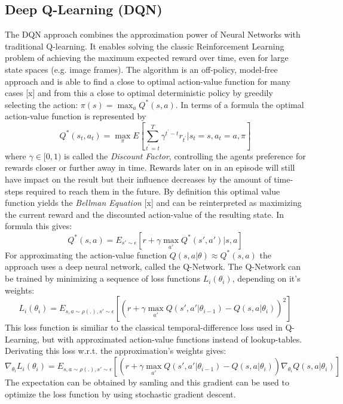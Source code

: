 \subsection{Deep Q-Learning (DQN) }
\nocite{mnih2015human}
\nocite{mnih2013playing}
\label{sec:DQN}
The DQN approach combines the approximation power of Neural Networks with traditional Q-learning.
It enables solving the classic Reinforcement Learning problem of achieving the maximum expected reward over time, even for large state spaces (e.g. image frames). The algorithm is an off-policy, model-free approach and is able to find a close to optimal action-value function for many cases [x] and from this a close to optimal deterministic policy by greedily selecting the action: $\pi(s)=\max_{a}Q^*(s,a)$. In terms of a formula the optimal action-value function is represented by
\[ 
Q^*(s_t,a_t)=\max_\pi E \left[
\sum_{t^{'}=t}^{T}\gamma^{t^{'}-t}r_{t^{'}}|s_t=s,
a_t=a, \pi \right] 
\]
 where $\gamma\in[0,1)$ is called the \textit{Discount Factor}, controlling the agents preference for rewards closer or further away in time. Rewards later on in an episode will still have impact on the result but their influence decreases by the amount of time-steps required to reach them in the future.
By definition this optimal value function yields the \textit{Bellman Equation} [x] and can be reinterpreted as maximizing the current reward and the discounted action-value of the resulting state. In formula this gives:
\[
Q^*(s,a) = E_{s'\sim\epsilon}\left[
r + \gamma \max_{a'}Q^*(s',a')|s,a \right]
\]
For approximating the action-value function $Q(s,a|\theta)\approx Q^*(s,a)$ the approach uses a deep neural network, called the Q-Network.
The Q-Network can be trained by minimizing a sequence of loss functions $L_i(\theta_i)$, depending on it's weights:
\[
L_i(\theta_i)=E_{s,a\sim\rho(.),s'\sim\epsilon}
\left[\left(r+\gamma \max_{a'} Q(s', 
a'|\theta_{i-1})-Q(s,a|\theta_i)\right)^2\right] 
\]
This loss function is similiar to the classical temporal-difference loss used in Q-Learning, but with approximated action-value functions instead of lookup-tables. Derivating this loss w.r.t. the approximation's weights gives:
\[
\nabla_{\theta_i}L_i(\theta_i)=E_{s,a\sim\rho(.),s'\sim\epsilon}
\left[\left(r+\gamma \max_{a'} Q(s', 
a'|\theta_{i-1})-Q(s,a|\theta_i)\right)\nabla_{\theta_i}Q(s,a|\theta_i)\right] 
\]
The expectation can be obtained by samling and this gradient can be used to optimize the loss function by using stochastic gradient descent.\\

